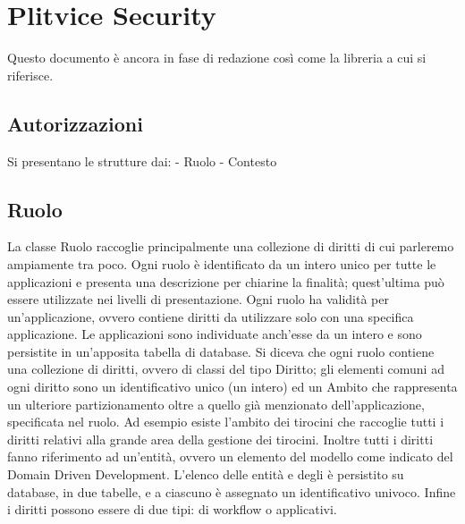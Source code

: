 \chapter{Plitvice Security}

Questo documento è ancora in fase di redazione così come la libreria a cui si riferisce.

\section{Autorizzazioni}
Si presentano le strutture dai:
- Ruolo
- Contesto

\section{Ruolo}
La classe Ruolo raccoglie principalmente una collezione di diritti di cui parleremo ampiamente tra poco. Ogni ruolo è identificato da un intero unico per tutte le applicazioni e presenta una descrizione per chiarine la finalità; quest'ultima può essere utilizzate nei livelli di presentazione. Ogni ruolo ha validità per un'applicazione, ovvero contiene diritti da utilizzare solo con una specifica applicazione. Le applicazioni sono individuate anch'esse da un intero e sono persistite in un'apposita tabella di database.
Si diceva che ogni ruolo contiene una collezione di diritti, ovvero di classi del tipo Diritto;  gli elementi comuni ad ogni diritto sono un identificativo unico (un intero) ed un Ambito che rappresenta un ulteriore partizionamento oltre a quello già menzionato dell'applicazione, specificata nel ruolo. Ad esempio esiste l'ambito dei tirocini che raccoglie tutti i diritti relativi alla grande area della gestione dei tirocini. Inoltre tutti i diritti fanno riferimento ad un'entità, ovvero un elemento del modello come indicato del Domain Driven Development. L'elenco delle entità e degli  è persistito su database, in due tabelle,  e a ciascuno è assegnato un identificativo univoco.
Infine i diritti possono essere di due tipi: di workflow o applicativi.

